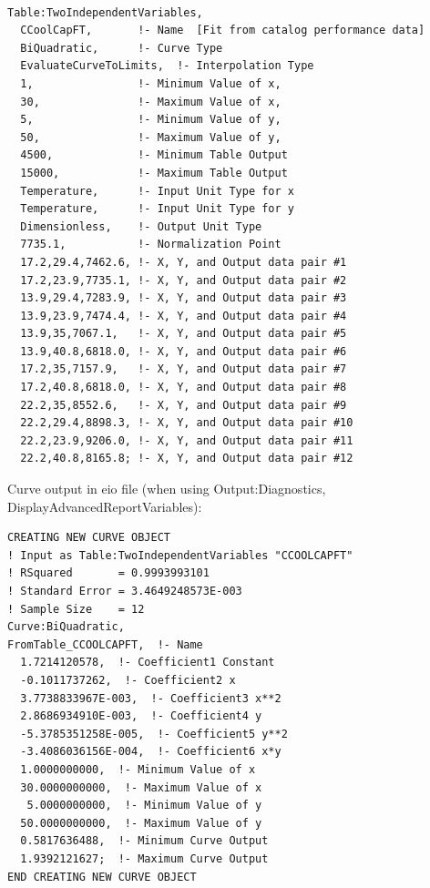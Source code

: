 \begin{lstlisting}

Table:TwoIndependentVariables,
  CCoolCapFT,       !- Name  [Fit from catalog performance data]
  BiQuadratic,      !- Curve Type
  EvaluateCurveToLimits,  !- Interpolation Type
  1,                !- Minimum Value of x,
  30,               !- Maximum Value of x,
  5,                !- Minimum Value of y,
  50,               !- Maximum Value of y,
  4500,             !- Minimum Table Output
  15000,            !- Maximum Table Output
  Temperature,      !- Input Unit Type for x
  Temperature,      !- Input Unit Type for y
  Dimensionless,    !- Output Unit Type
  7735.1,           !- Normalization Point
  17.2,29.4,7462.6, !- X, Y, and Output data pair #1
  17.2,23.9,7735.1, !- X, Y, and Output data pair #2
  13.9,29.4,7283.9, !- X, Y, and Output data pair #3
  13.9,23.9,7474.4, !- X, Y, and Output data pair #4
  13.9,35,7067.1,   !- X, Y, and Output data pair #5
  13.9,40.8,6818.0, !- X, Y, and Output data pair #6
  17.2,35,7157.9,   !- X, Y, and Output data pair #7
  17.2,40.8,6818.0, !- X, Y, and Output data pair #8
  22.2,35,8552.6,   !- X, Y, and Output data pair #9
  22.2,29.4,8898.3, !- X, Y, and Output data pair #10
  22.2,23.9,9206.0, !- X, Y, and Output data pair #11
  22.2,40.8,8165.8; !- X, Y, and Output data pair #12
\end{lstlisting}

Curve output in eio file (when using Output:Diagnostics, DisplayAdvancedReportVariables):

\begin{lstlisting}
CREATING NEW CURVE OBJECT
! Input as Table:TwoIndependentVariables "CCOOLCAPFT"
! RSquared       = 0.9993993101
! Standard Error = 3.4649248573E-003
! Sample Size    = 12
Curve:BiQuadratic,
FromTable_CCOOLCAPFT,  !- Name
  1.7214120578,  !- Coefficient1 Constant
  -0.1011737262,  !- Coefficient2 x
  3.7738833967E-003,  !- Coefficient3 x**2
  2.8686934910E-003,  !- Coefficient4 y
  -5.3785351258E-005,  !- Coefficient5 y**2
  -3.4086036156E-004,  !- Coefficient6 x*y
  1.0000000000,  !- Minimum Value of x
  30.0000000000,  !- Maximum Value of x
   5.0000000000,  !- Minimum Value of y
  50.0000000000,  !- Maximum Value of y
  0.5817636488,  !- Minimum Curve Output
  1.9392121627;  !- Maximum Curve Output
END CREATING NEW CURVE OBJECT
\end{lstlisting}

